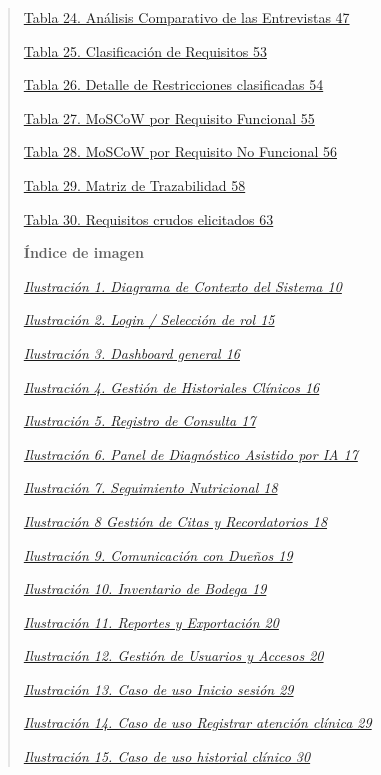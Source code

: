 \documentclass[
]{article}
\begin{document}
\begin{quote}
\hyperref[_bookmark84]{Tabla 24. Análisis Comparativo de las Entrevistas
47}

\hyperref[_bookmark102]{Tabla 25. Clasificación de Requisitos 53}

\hyperref[_bookmark103]{Tabla 26. Detalle de Restricciones clasificadas
54}

\hyperref[_bookmark104]{Tabla 27. MoSCoW por Requisito Funcional 55}

\hyperref[_bookmark106]{Tabla 28. MoSCoW por Requisito No Funcional 56}

\hyperref[_bookmark113]{Tabla 29. Matriz de Trazabilidad 58}

\hyperref[_bookmark117]{Tabla 30. Requisitos crudos elicitados 63}

\textbf{Índice de imagen}

\hyperref[_bookmark13]{\emph{Ilustración 1. Diagrama de Contexto del
Sistema 10}}

\hyperref[_bookmark25]{\emph{Ilustración 2. Login / Selección de rol
15}}

\hyperref[_bookmark26]{\emph{Ilustración 3. Dashboard general 16}}

\hyperref[_bookmark27]{\emph{Ilustración 4. Gestión de Historiales
Clínicos 16}}

\hyperref[_bookmark28]{\emph{Ilustración 5. Registro de Consulta 17}}

\hyperref[_bookmark29]{\emph{Ilustración 6. Panel de Diagnóstico
Asistido por IA 17}}

\hyperref[_bookmark30]{\emph{Ilustración 7. Seguimiento Nutricional 18}}

\hyperref[_bookmark31]{\emph{Ilustración 8 Gestión de Citas y
Recordatorios 18}}

\hyperref[_bookmark32]{\emph{Ilustración 9. Comunicación con Dueños 19}}

\hyperref[_bookmark33]{\emph{Ilustración 10. Inventario de Bodega 19}}

\hyperref[_bookmark34]{\emph{Ilustración 11. Reportes y Exportación 20}}

\hyperref[_bookmark35]{\emph{Ilustración 12. Gestión de Usuarios y
Accesos 20}}

\hyperref[_bookmark44]{\emph{Ilustración 13. Caso de uso Inicio sesión
29}}

\hyperref[_bookmark45]{\emph{Ilustración 14. Caso de uso Registrar
atención clínica 29}}

\hyperref[_bookmark46]{\emph{Ilustración 15. Caso de uso historial
clínico 30}}


\end{quote}
\end{document}

